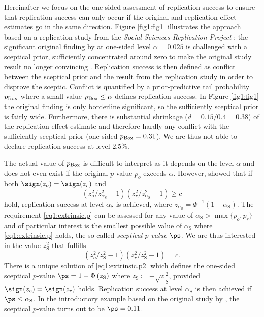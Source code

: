 Hereinafter we focus on the one-sided assessment of replication success to
ensure that replication success can only occur if the original and replication
effect estimates go in the same direction. Figure \ref{fig1:fig1} illustrates
the \citet{Held2020} approach based on a replication study from the
\textit{Social Sciences Replication Project} \citep{Camerer2018}: the
significant original finding by \citet{Pyc2010} at one-sided level
$\alpha=0.025$ is challenged with a sceptical prior, sufficiently concentrated
around zero to make the original study result no longer convincing
\citep{Matthews2001a,Matthews2001b}. Replication success is then defined as
conflict between the sceptical prior and the result from the replication study
in order to disprove the sceptic. Conflict is quantified by a prior-predictive
tail probability $p_{\mbox{\scriptsize Box}}$ \citep{Box1980} where a small
value $p_{\mbox{\scriptsize Box}} \leq \alpha$ defines replication success. In
Figure \ref{fig1:fig1} the original finding is only borderline significant, so
the sufficiently sceptical prior is fairly wide. Furthermore, there is
substantial shrinkage ($d = 0.15/0.4 = 0.38$) of the replication effect estimate
and therefore hardly any conflict with the sufficiently sceptical prior
(one-sided $p_{\mbox{\scriptsize Box}}=0.31$). We are thus not able to declare
replication success at level $2.5$\%.

The actual value of $p_{\mbox{\scriptsize Box}}$ is difficult to interpret as it
depends on the level $\alpha$ and does not even exist if the original $p$-value
$p_o$ exceeds $\alpha$. However, \citet{Held2020} showed that if both
$\sign(z_o)=\sign(z_r)$ and
\begin{equation}\label{eq1:extrinsic.p}
\left({z_o^2}/{z_{{\alpha_{\mathrm{S}}}}^2}-1 \right) \left({z_r^2}/{z_{{\alpha_{\mathrm{S}}}}^2}
- 1 \right) \geq c
\end{equation}
hold, replication success at level ${\alpha_{\mathrm{S}}}$ is achieved, where
$z_{{\alpha_{\mathrm{S}}}} = \Phi^{-1}(1-{\alpha_{\mathrm{S}}})$. The
requirement \eqref{eq1:extrinsic.p} can be assessed for any value of
${{\alpha_{\mathrm{S}}}} > \max\{p_o, p_r\}$ and of particular interest is the
smallest possible value of $\alpha_{\mathrm{S}}$ where \eqref{eq1:extrinsic.p}
holds, the so-called \textit{sceptical $p$-value} $\ps$. We are thus interested
in the value $z_{\mathrm{S}}^2$ that fulfills
\begin{equation}\label{eq1:extrinsic.p2}
\left({z_o^2}/{z_{\mathrm{S}}^2}-1 \right) \left({z_r^2}/{z_{\mathrm{S}}^2}
- 1 \right) = c.
\end{equation}
There is a unique solution of \eqref{eq1:extrinsic.p2} which defines the
one-sided {sceptical $p$-value} $\ps= 1-\Phi\left({z_{\mathrm{S}}}\right)$ where
$z_{\mathrm{S}} \coloneqq + \surd z_{\mathrm{S}}^2$, provided
$\sign(z_o)=\sign(z_r)$ holds. Replication success at level
$\alpha_{\mathrm{S}}$ is then achieved if $\ps \leq \alpha_{\mathrm{S}}$. In the
introductory example based on the original study by \citet{Pyc2010}, the
sceptical $p$-value turns out to be $\ps=0.11$.

